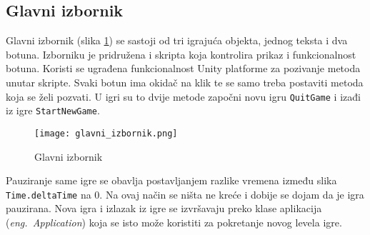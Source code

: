 \subsection{Glavni izbornik}
Glavni izbornik (slika \ref{fig:glavniIzbornik}) se sastoji od tri igrajuća objekta, jednog teksta i dva botuna. Izborniku je pridružena i skripta koja kontrolira prikaz i funkcionalnost botuna. Koristi se ugrađena funkcionalnost Unity platforme za pozivanje metoda unutar skripte. Svaki botun ima okidač na klik te se samo treba postaviti metoda koja se želi pozvati. U igri su to dvije metode započni novu igru \texttt{QuitGame} i izađi iz igre \texttt{StartNewGame}. 
\begin{figure}[h]
	\texttt{[image: glavni\_izbornik.png]}
	\centering
	\caption{Glavni izbornik}
	\label{fig:glavniIzbornik}
\end{figure}

Pauziranje same igre se obavlja postavljanjem razlike vremena između slika \texttt{Time.deltaTime} na 0. Na ovaj način se ništa ne kreće i dobije se dojam da je igra pauzirana. Nova igra i izlazak iz igre se izvršavaju preko klase aplikacija (\emph{eng.~Application}) koja se isto može koristiti za pokretanje novog levela igre.